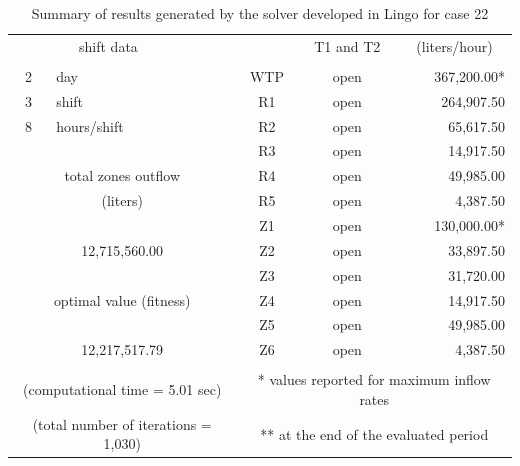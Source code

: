 \documentclass{singlecol}
\theoremstyle{TH}{
\newtheorem{lemma}{Lemma}
\newtheorem{theorem}[lemma]{Theorem}
\newtheorem{corrolary}[lemma]{Corrolary}
\newtheorem{conjecture}[lemma]{Conjecture}
\newtheorem{proposition}[lemma]{Proposition}
\newtheorem{claim}[lemma]{Claim}
\newtheorem{stheorem}[lemma]{Wrong Theorem}
\newtheorem{algorithm}{Algorithm}
}
\theoremstyle{THrm}{
\newtheorem{definition}{Definition}[section]
\newtheorem{question}{Question}[section]
\newtheorem{remark}{Remark}
\newtheorem{scheme}{Scheme}
}
\theoremstyle{THhit}{
\newtheorem{case}{Case}[section]
}
\begin{document}
\begin{table}[t]
\begin{center}
\begin{small}
\begin{tabular}{ c r r r r r }
		\multicolumn{2}{c}{shift data}     &   &      & \multicolumn{1}{c}{T1 and T2}        & \multicolumn{1}{c}{(liters/hour)}  \\
		   \\
		2   &  \multicolumn{1}{l}{day}   &              		& \multicolumn{1}{c}{WTP}    & \multicolumn{1}{c}{open} &  367,200.00* \\
		3   &  \multicolumn{1}{l}{shift}  &         			& \multicolumn{1}{c}{R1}     & \multicolumn{1}{c}{open} &  264,907.50  \\
		8   &  \multicolumn{1}{l}{hours/shift}        &         & \multicolumn{1}{c}{R2}     & \multicolumn{1}{c}{open} &   65,617.50  \\
	   &      &              									& \multicolumn{1}{c}{R3}     & \multicolumn{1}{c}{open} &   14,917.50  \\
	   \multicolumn{3}{c}{total zones outflow}                  & \multicolumn{1}{c}{R4}     & \multicolumn{1}{c}{open} &   49,985.00  \\
	   \multicolumn{3}{c}{(liters)}              				& \multicolumn{1}{c}{R5}     & \multicolumn{1}{c}{open} &    4,387.50  \\
	   &      &              									& \multicolumn{1}{c}{Z1}     & \multicolumn{1}{c}{open} &  130,000.00* \\
	   \multicolumn{3}{c}{12,715,560.00}              			& \multicolumn{1}{c}{Z2}     & \multicolumn{1}{c}{open} &   33,897.50  \\
	      &              &              						& \multicolumn{1}{c}{Z3}     & \multicolumn{1}{c}{open} &   31,720.00  \\
	   \multicolumn{3}{c}{optimal value (fitness)}              & \multicolumn{1}{c}{Z4}     & \multicolumn{1}{c}{open} &   14,917.50  \\
	   &             &             						 		& \multicolumn{1}{c}{Z5}     & \multicolumn{1}{c}{open} &   49,985.00  \\
	   \multicolumn{3}{c}{12,217,517.79}              			& \multicolumn{1}{c}{Z6}     & \multicolumn{1}{c}{open} &    4,387.50  \\
	   \\
	   \multicolumn{3}{c}{(computational time = 5.01 sec)} & \multicolumn{3}{c}{* values reported for maximum inflow rates} \\
	   \multicolumn{3}{c}{(total number of iterations = 1,030)} & \multicolumn{3}{c}{** at the end of the evaluated period} 

	\end{tabular}
\caption{Summary of results generated by the solver developed in Lingo for case 22}
\label{tab:lingoEvaluationsCase22}
\end{small}
\end{center}
\end{table}
\end{document}
